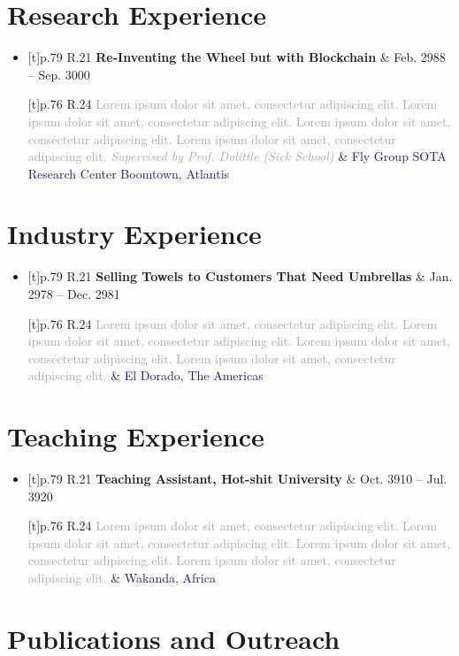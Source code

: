 \documentclass[letterpaper,10pt]{article}
\newcommand{\Subheading}[4]{
  \vspace{1pt}\item
    \begin{tabularx}{\textwidth}[t]{p{.79\linewidth} R{.21\linewidth}}
      \textbf{#1} & #2
    \end{tabularx}
    \SubTable{#3}{#4}\vspace{-5pt}
}
\newcommand{\SubTable}[2]{
    \begin{tabularx}{\textwidth}[t]{p{.76\linewidth} R{.24\linewidth}}
        \small{\textcolor{darkgray}{#2}} & \textcolor{MidnightBlue}{\small #1} \\
    \end{tabularx}
}
\newcommand{\SubHeadingListStart}{\begin{itemize}[
    leftmargin=0in, label={}]}
\newcommand{\SubHeadingListEnd}{\end{itemize}}
\begin{document}
\section{Research Experience}
    \SubHeadingListStart
        \Subheading
        {Re-Inventing the Wheel but with Blockchain}
        {Feb. 2988 -- Sep. 3000}{
            \hspace*{\fill}Fly Group\newline
            \hspace*{\fill}SOTA Research Center\newline   
            \hspace*{\fill}Boomtown, Atlantis\newline
        }
        {
            Lorem ipsum dolor sit amet, consectetur adipiscing elit. Lorem ipsum dolor sit amet, consectetur adipiscing elit. Lorem ipsum dolor sit amet, consectetur adipiscing elit. Lorem ipsum dolor sit amet, consectetur adipiscing elit. 
            \newline\textit{Supervised by Prof. Dolittle (Sick School)}
        }        
    \SubHeadingListEnd
        
\section{Industry Experience}
    \SubHeadingListStart
        \Subheading{Selling Towels to Customers That Need Umbrellas}
        {Jan. 2978 -- Dec. 2981}{El Dorado, The Americas}{
            Lorem ipsum dolor sit amet, consectetur adipiscing elit. Lorem ipsum dolor sit amet, consectetur adipiscing elit. Lorem ipsum dolor sit amet, consectetur adipiscing elit. Lorem ipsum dolor sit amet, consectetur adipiscing elit. 
        }
    \SubHeadingListEnd


\section{Teaching Experience}
    \SubHeadingListStart
        \Subheading{Teaching Assistant, Hot-shit University}{Oct. 3910 -- Jul. 3920}{Wakanda, Africa}
        {
            Lorem ipsum dolor sit amet, consectetur adipiscing elit. Lorem ipsum dolor sit amet, consectetur adipiscing elit. Lorem ipsum dolor sit amet, consectetur adipiscing elit. Lorem ipsum dolor sit amet, consectetur adipiscing elit.
        }
    \SubHeadingListEnd

\section{Publications and Outreach}
\end{document}
